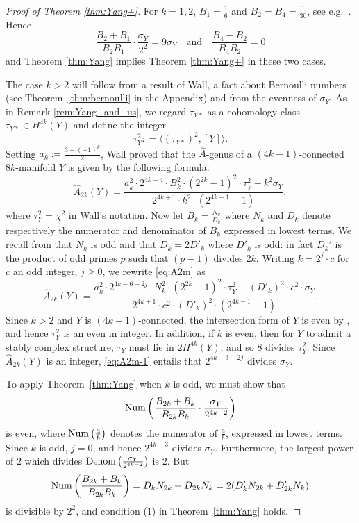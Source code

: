 \documentclass[12pt]{amsart}
\newcommand\Num{\textup{Num}}
\newcommand\Denom{\textup{Denom}}
\newcommand{\an}[1]{\langle{#1}{\rangle}}
\newcommand{\wh}{\widehat}
\theoremstyle{remark}
\begin{document}
\begin{proof}[Proof of Theorem \ref{thm:Yang+}]
For $k=1, 2$, $B_1 = \frac{1}{6}$ and $B_2 = B_4 = \frac{1}{30}$, see
e.g.~\cite[p.\,12]{Hirzebruch66}.  Hence
%
\[ \frac{B_{2}+B_{1}}{B_{2}B_{1}} 
\cdot \frac{\sigma_Y}{2^{2}} = 9 \sigma_Y \quad \text{and} \quad
\frac{B_{4}-B_{2}}{B_{4}B_{2}}= 0\]
%
and Theorem \ref{thm:Yang} implies Theorem \ref{thm:Yang+} in these two cases.

The case $k > 2$ will follow from a result of Wall, a fact about Bernoulli numbers (see
Theorem~\ref{thm:bernoulli} in the Appendix) and from the evenness of
$\sigma_Y$.  As in Remark \ref{rem:Yang_and_us}, we regard $\tau_{Y*}$ as 
a cohomology class $\tau_{Y*} \in H^{4k}(Y)$ and define the integer
%
\[ \tau_Y^2 : = \an{(\tau_{Y*})^2, [Y]}. \]
%
%
Setting $a_k := \frac{3-(-1)^k}{2}$, Wall \cite[$(15)_m$]{Wall62} proved
that the $\wh A$-genus of a $(4k{-}1)$-connected $8k$-manifold $Y$ is given by the following formula:
%
\begin{equation} \label{eq:A2m}
\wh A_{2k}(Y) = 
\frac{a_k^2 \cdot 2^{4k-4}\cdot B_k^2 \cdot (2^{2k}-1)^2 \cdot \tau_Y^2 - k^2 \sigma_Y}{2^{4k{+}1} \cdot k^2 \cdot(2^{4k{-}1}-1)},
\end{equation}
%
where $\tau_Y^2 = \chi^2$ in Wall's notation. Now let $B_k = \frac{N_k}{D_k}$ where $N_k$ and $D_k$ denote
respectively the numerator and denominator of $B_k$ expressed in
lowest terms.  We recall from \cite[p.\,284]{Milnor&Stasheff74} that
$N_k$ is odd and that $D_k = 2 D'_k$ where $D'_k$ is odd: in fact
$D_k'$ is the product of odd primes $p$ such that $(p-1)$ divides
$2k$. Writing  $k = 2^j \cdot c$ for $c$ an odd integer,
$j \geq 0$, we rewrite \eqref{eq:A2m} as
%
\begin{equation} \label{eq:A2m-1}
 \wh A_{2k}(Y) = 
\frac{a_k^2 \cdot 2^{4k-6-2j} \cdot N_k^2 \cdot (2^{2k}-1)^2 \cdot \tau_Y^2 - (D'_k)^2 \cdot c^2 \cdot \sigma_Y}
{2^{4k{+}1} \cdot c^2 \cdot (D'_k)^2 \cdot (2^{4k{-}1}-1)  }. 
\end{equation}
%
Since $k > 2$ and $Y$ is $(4k{-}1)$-connected, the intersection form of $Y$ is 
even by \cite{Wall62}, and hence $\tau_Y^2$ is an even in integer.  In addition, if
$k$ is even, then for $Y$ to admit a stably complex structure, $\tau_Y$ 
must lie in $2H^{4k}(Y)$, and so $8$ divides $\tau_Y^2$.
Since $\wh A_{2k}(Y)$ is an integer, \eqref{eq:A2m-1} entails that $
2^{4k-3-2j}$ divides $\sigma_Y$.

To apply Theorem~\ref{thm:Yang} when $k$ is odd,
we must show that
%
\[ \Num \left( \frac{B_{2k}+B_{k}}{B_{2k}B_{k}} \cdot \frac{\sigma_Y}{2^{4k{-}2}}
 \right) \]
%
is even, where $\Num \left( \frac{a}{b}\right) $ denotes the
numerator of $\frac{a}{b}$, expressed in lowest terms. Since $k$ is odd, $j = 0$, and hence $2^{4k-3}$ divides $\sigma_Y$. 
Furthermore, the largest power of $2$ which divides $\Denom \left(
\frac{\sigma_Y}{2^{4k{-}2}} \right)$ is $2$.  But
%
\[ \Num \left( \frac{B_{2k}+B_k}{B_{2k}B_k} \right) = 
D_kN_{2k}+D_{2k}N_k = 2(D'_kN_{2k} + D'_{2k}N_k)\]
%
is divisible by $2^2$, and condition (1) in Theorem~\ref{thm:Yang} holds.


\end{proof}
\end{document}
